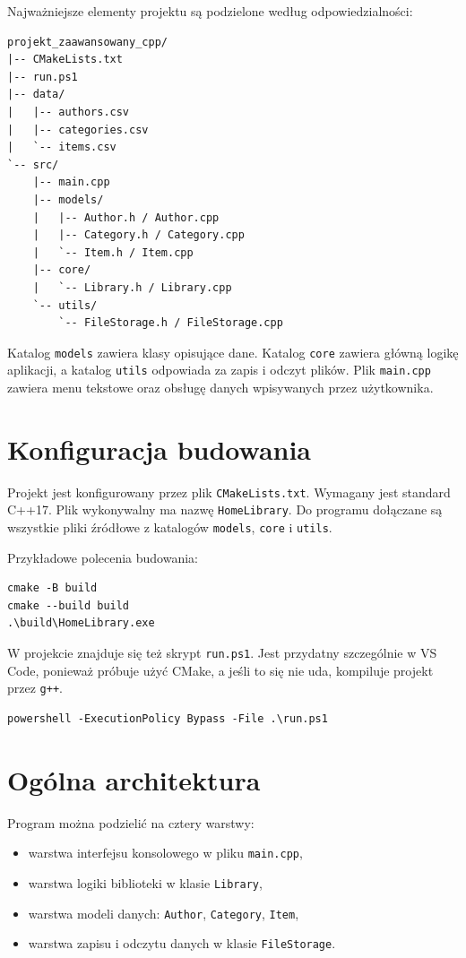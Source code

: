 \documentclass[12pt,a4paper]{article}
\begin{document}
Najważniejsze elementy projektu są podzielone według odpowiedzialności:

\begin{lstlisting}
projekt_zaawansowany_cpp/
|-- CMakeLists.txt
|-- run.ps1
|-- data/
|   |-- authors.csv
|   |-- categories.csv
|   `-- items.csv
`-- src/
    |-- main.cpp
    |-- models/
    |   |-- Author.h / Author.cpp
    |   |-- Category.h / Category.cpp
    |   `-- Item.h / Item.cpp
    |-- core/
    |   `-- Library.h / Library.cpp
    `-- utils/
        `-- FileStorage.h / FileStorage.cpp
\end{lstlisting}

Katalog \texttt{models} zawiera klasy opisujące dane. Katalog \texttt{core} zawiera
główną logikę aplikacji, a katalog \texttt{utils} odpowiada za zapis i odczyt plików.
Plik \texttt{main.cpp} zawiera menu tekstowe oraz obsługę danych wpisywanych przez
użytkownika.

\section{Konfiguracja budowania}

Projekt jest konfigurowany przez plik \texttt{CMakeLists.txt}. Wymagany jest standard
C++17. Plik wykonywalny ma nazwę \texttt{HomeLibrary}. Do programu dołączane są
wszystkie pliki źródłowe z katalogów \texttt{models}, \texttt{core} i \texttt{utils}.

Przykładowe polecenia budowania:

\begin{lstlisting}
cmake -B build
cmake --build build
.\build\HomeLibrary.exe
\end{lstlisting}

W projekcie znajduje się też skrypt \texttt{run.ps1}. Jest przydatny szczególnie w
VS Code, ponieważ próbuje użyć CMake, a jeśli to się nie uda, kompiluje projekt przez
\texttt{g++}.

\begin{lstlisting}
powershell -ExecutionPolicy Bypass -File .\run.ps1
\end{lstlisting}

\section{Ogólna architektura}

Program można podzielić na cztery warstwy:

\begin{itemize}
    \item warstwa interfejsu konsolowego w pliku \texttt{main.cpp},
    \item warstwa logiki biblioteki w klasie \texttt{Library},
    \item warstwa modeli danych: \texttt{Author}, \texttt{Category}, \texttt{Item},
    \item warstwa zapisu i odczytu danych w klasie \texttt{FileStorage}.
\end{itemize}
\end{document}
